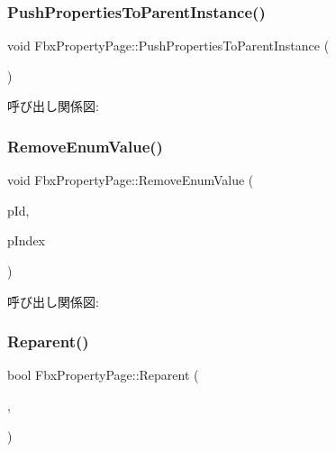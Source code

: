 \subsubsection{\texorpdfstring{Push\+Properties\+To\+Parent\+Instance()}{PushPropertiesToParentInstance()}}
{\footnotesize\ttfamily void Fbx\+Property\+Page\+::\+Push\+Properties\+To\+Parent\+Instance (\begin{DoxyParamCaption}{ }\end{DoxyParamCaption})}

呼び出し関係図\+:
\mbox{\label{class_fbx_property_page_a342af6839e0b286988b8f7fe71f9675c}} 
\subsubsection{\texorpdfstring{Remove\+Enum\+Value()}{RemoveEnumValue()}}
{\footnotesize\ttfamily void Fbx\+Property\+Page\+::\+Remove\+Enum\+Value (\begin{DoxyParamCaption}\item[{\hyperlink{fbxtypes_8h_a088fa96de3b0b3ea69f0f6afef525dfb}{Fbx\+Int}}]{p\+Id,  }\item[{int}]{p\+Index }\end{DoxyParamCaption})}

呼び出し関係図\+:
\mbox{\label{class_fbx_property_page_a87dae3f5389fc8da0f19cdad06e1a71c}} 
\subsubsection{\texorpdfstring{Reparent()}{Reparent()}}
{\footnotesize\ttfamily bool Fbx\+Property\+Page\+::\+Reparent (\begin{DoxyParamCaption}\item[{\hyperlink{fbxtypes_8h_a088fa96de3b0b3ea69f0f6afef525dfb}{Fbx\+Int}}]{,  }\item[{\hyperlink{fbxtypes_8h_a088fa96de3b0b3ea69f0f6afef525dfb}{Fbx\+Int}}]{ }\end{DoxyParamCaption})}

\mbox{\label{class_fbx_property_page_a7e58b958d273e25965c6dbbcd6c394e6}} 
